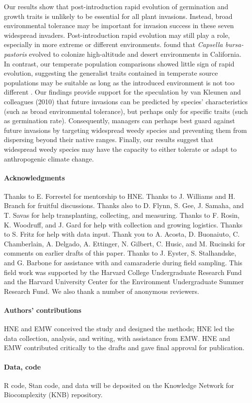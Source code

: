 \documentclass[12pt]{article}\usepackage[]{graphicx}\usepackage[]{color}
\begin{document}
	Our results show that post-introduction rapid evolution of germination and growth traits is unlikely to be essential for all plant invasions. Instead, broad environmental tolerance may be important for invasion success in these seven widespread invaders. Post-introduction rapid evolution may still play a role, especially in more extreme or different environments.  \textcite{Linde2001} found that \textit{Capsella bursa-pastoris} evolved to colonize high-altitude and desert environments in California. In contrast, our temperate population comparisons showed little sign of rapid evolution, suggesting the generalist traits contained in temperate source populations may be suitable as long as the introduced environment is not too different \parencite{Baker1965}. Our findings provide support for  the speculation by van Kleunen and colleagues (2010) that future invasions can be predicted by species' characteristics (such as broad environmental tolerance), but perhaps only for specific traits (such as germination rate). Consequently, managers can perhaps best guard against future invasions by targeting widespread weedy species and preventing them from dispersing beyond their native ranges. Finally, our results suggest that widespread weedy species may have the capacity to either tolerate or adapt to anthropogenic climate change. 
	
\paragraph{Acknowledgments}
Thanks to E. Forrestel for mentorship to HNE. Thanks to J. Williams and H. Branch for fruitful discussions. Thanks also to D. Flynn, S. Gee, J. Samaha, and T. Savas for help transplanting, collecting, and measuring. Thanks to F. Rosin, K. Woodruff, and J. Gard for help with collection and growing logistics. Thanks to S. Fritz for help with data input. Thank you to A. Acosta, D. Buonaiuto, C. Chamberlain, A. Delgado, A. Ettinger, N. Gilbert, C. Husic, and M. Rucinski for comments on earlier drafts of this paper. Thanks to J. Eyster, S. Stalhandske, and G. Barbone for assistance with and camaraderie during field sampling. This field work was supported by the Harvard College Undergraduate Research Fund and the Harvard University Center for the Environment Undergraduate Summer Research Fund. We also thank a number of anonymous reviewers. 

\paragraph{Authors' contributions} HNE and EMW conceived the study and designed the methods; HNE led the data collection, analysis, and writing, with assistance from EMW. HNE and EMW contributed critically to the drafts and gave final approval for publication.

\paragraph{Data, code} 
R code, Stan code, and data will be deposited on the Knowledge Network for Biocomplexity (KNB) repository. 
\printbibliography 
\end{document}
